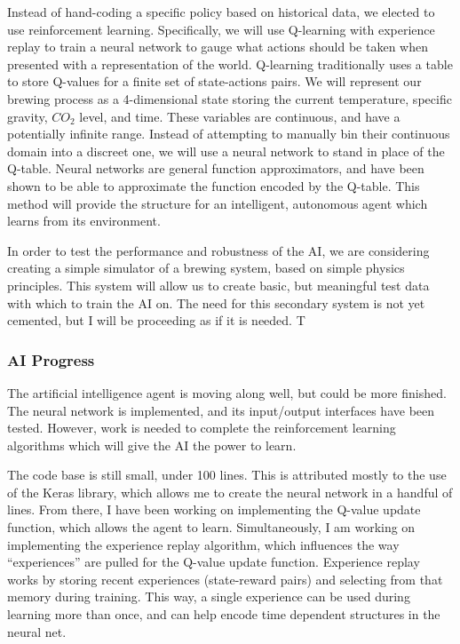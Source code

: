 \documentclass[draftclsnofoot,onecolumn,letterpaper,10pt]{IEEEtran}
\begin{document}
Instead of hand-coding a specific policy based on historical data, we elected to use reinforcement learning.
Specifically, we will use Q-learning with experience replay to train a neural network to gauge what actions should be taken when presented with a representation of the world.
Q-learning traditionally uses a table to store Q-values for a finite set of state-actions pairs.
We will represent our brewing process as a 4-dimensional state storing the current temperature, specific gravity, $CO_2$ level, and time.
These variables are continuous, and have a potentially infinite range.
Instead of attempting to manually bin their continuous domain into a discreet one, we will use a neural network to stand in place of the Q-table.
Neural networks are general function approximators, and have been shown to be able to approximate the function encoded by the Q-table.
This method will provide the structure for an intelligent, autonomous agent which learns from its environment.

In order to test the performance and robustness of the AI, we are considering creating a simple simulator of a brewing system, based on simple physics principles.
This system will allow us to create basic, but meaningful test data with which to train the AI on.
The need for this secondary system is not yet cemented, but I will be proceeding as if it is needed.
T


\subsubsection{AI Progress}
The artificial intelligence agent is moving along well, but could be more finished.
The neural network is implemented, and its input/output interfaces have been tested.
However, work is needed to complete the reinforcement learning algorithms which will give the AI the power to learn.

The code base is still small, under 100 lines.
This is attributed mostly to the use of the Keras library, which allows me to create the neural network in a handful of lines.
From there, I have been working on implementing the Q-value update function, which allows the agent to learn.
Simultaneously, I am working on implementing the experience replay algorithm, which influences the way ``experiences'' are pulled for the Q-value update function.
Experience replay works by storing recent experiences (state-reward pairs) and selecting from that memory during training.
This way, a single experience can be used during learning more than once, and can help encode time dependent structures in the neural net.
\end{document}
